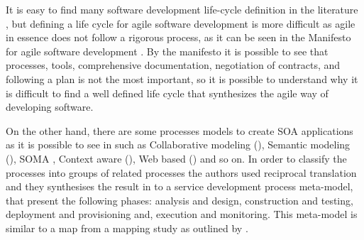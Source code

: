 
It is easy to find many software development life-cycle definition in the literature \cite{IEEE_Std_1074_1997,sommerville2007software,abrahamsson2003new,IEEE_Std_12207_2008,chatterjee2008software}, but defining a life cycle for agile software development is more difficult as agile in essence does not follow a rigorous process, as it can be seen in the Manifesto for agile software development \cite{alliance2001agile}. By the manifesto it is possible to see that processes, tools, comprehensive documentation, negotiation of contracts, and following a plan is not the most important, so it is possible to understand why it is difficult to find a well defined life cycle that synthesizes the agile way of developing software. 

On the other hand, there are some processes models to create \acrfull{SOA} applications as it is possible to see in \citet{Lane2011} such as Collaborative modeling (), Semantic modeling (), SOMA \cite{ArsanjaniSOMA2006}, Context aware (), Web based () and so on. In order to classify the processes into groups of related processes the authors used reciprocal translation \cite{noblit1988meta} and they synthesises the result in to a service development process meta-model, that present the following phases: analysis and design, construction and testing, deployment and provisioning and, execution and monitoring. This meta-model is similar to a map from a mapping study as outlined by \cite{budgen2008using,Petersen2008}.
